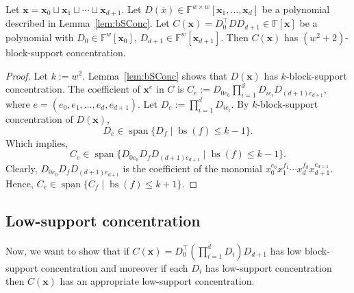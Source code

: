\documentclass[final,oneeqnum, onethmnum, onefignum]{siamltex1213}
\newcommand{\F}{\mathbb F}
\newcommand{\Dx}{D(\mathbf{x})}
\DeclareMathOperator{\Span}{span}
\DeclareMathOperator{\bs}{bs}
\newcommand{\x}{\mathbf{x}}
\renewcommand{\o}[1]{\overline{#1}}
\begin{document}
\begin{lemma}
\label{lem:CbSConc}
Let $\mathbf{x} = \mathbf{x}_0 \sqcup \mathbf{x}_1 \sqcup \dotsm \sqcup \mathbf{x}_{d+1}$.
Let $D(\o{x}) \in \F^{w \times w}[\mathbf{x}_1, \dots, \mathbf{x}_d]$
 be a polynomial described in Lemma~\ref{lem:bSConc}.
Let $C(\mathbf{x}) = D_0^{\top} D D_{d+1} \in \F[\mathbf{x}]$
 be a polynomial
with $D_0 \in \F^w[\mathbf{x}_0]$, $D_{d+1} \in \F^w[\mathbf{x}_{d+1}]$.
Then $C(\mathbf{x})$ has $(w^2+2)$-block-support concentration.  
\end{lemma}
\begin{proof}
Let $k:=w^2$.
Lemma~\ref{lem:bSConc} shows that $\Dx$
 has $k$-block-support concentration. 
The coefficient of $\mathbf{x}^e$ in $C$ 
is $C_e := D_{0e_0} \prod_{i=1}^d D_{ie_i} D_{(d+1)e_{d+1}}$,
where $e = (e_0, e_1, \dots,e_d, e_{d+1})$. 
Let $D_e := \prod_{i=1}^d D_{ie_i}$.
By $k$-block-support concentration of $\Dx$,
$$D_e \in \Span\{ D_f \mid \bs(f) \leq k-1 \}.$$
Which implies, 
$$C_e \in \Span\{ D_{0e_0} D_f D_{(d+1)e_{d+1}} \mid \bs(f) \leq k-1 \}.$$ 
Clearly, $D_{0e_0} D_f D_{(d+1)e_{d+1}}$ is the coefficient of the monomial 
$x_0^{e_0} x_1^{f_1} \dotsm x_d^{f_d} x_{d+1}^{e_{d+1}}$. 
Hence, $C_e \in \Span\{  C_f \mid \bs(f) \leq k+1 \}$.
\end{proof}


\subsection{Low-support concentration}
Now, we want to show that if 
$C(\mathbf{x}) = D_0^{\top} (\prod_{i=1}^{d} D_i)  D_{d+1}$ has
low block-support concentration and moreover if each $D_i$ has 
low-support concentration then $C(\x)$ has an appropriate low-support concentration. 
\end{document}
